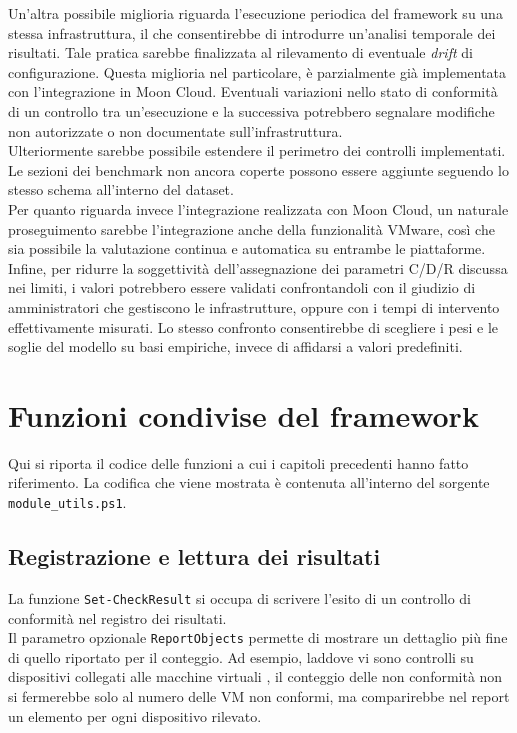 \documentclass[a4paper,11pt]{report}
\begin{document}
Un'altra possibile miglioria riguarda l'esecuzione periodica del framework su una stessa infrastruttura, il che consentirebbe di introdurre un'analisi temporale dei risultati. Tale pratica sarebbe finalizzata al rilevamento di eventuale \textit{drift} di configurazione. Questa miglioria nel particolare, è parzialmente già implementata con l'integrazione in Moon Cloud.
Eventuali variazioni nello stato di conformità di un controllo tra un'esecuzione e la successiva potrebbero segnalare modifiche non autorizzate o non documentate sull'infrastruttura. \\
Ulteriormente sarebbe possibile estendere il perimetro dei controlli implementati. Le sezioni dei benchmark non ancora coperte possono essere aggiunte seguendo lo stesso schema all'interno del dataset.\\

Per quanto riguarda invece l'integrazione realizzata con Moon Cloud, un naturale proseguimento sarebbe l'integrazione anche della funzionalità VMware, così che sia possibile la valutazione continua e automatica su entrambe le piattaforme.\\
 
Infine, per ridurre la soggettività dell'assegnazione dei parametri C/D/R discussa nei limiti, i valori potrebbero essere validati confrontandoli con il giudizio di amministratori che gestiscono le infrastrutture, oppure con i tempi di intervento effettivamente misurati. Lo stesso confronto consentirebbe di scegliere i pesi e le soglie del modello su basi empiriche, invece di affidarsi a valori predefiniti.



\appendix
\chapter{Funzioni condivise del framework}
\label{app:funzioni}

Qui si riporta il codice delle funzioni a cui i capitoli precedenti hanno fatto riferimento. La codifica che viene mostrata è contenuta all'interno del sorgente \texttt{module\_utils.ps1}. 

\section{Registrazione e lettura dei risultati}
\label{app:registro}

La funzione \texttt{Set-CheckResult} si occupa di scrivere l'esito di un controllo di conformità nel registro dei risultati.\\
Il parametro opzionale \texttt{ReportObjects} permette di mostrare un dettaglio più fine di quello riportato per il conteggio. Ad esempio, laddove vi sono controlli su dispositivi collegati alle macchine virtuali , il conteggio delle non conformità non si fermerebbe solo al numero delle VM non conformi, ma comparirebbe nel report un elemento per ogni dispositivo rilevato.\\
\end{document}

